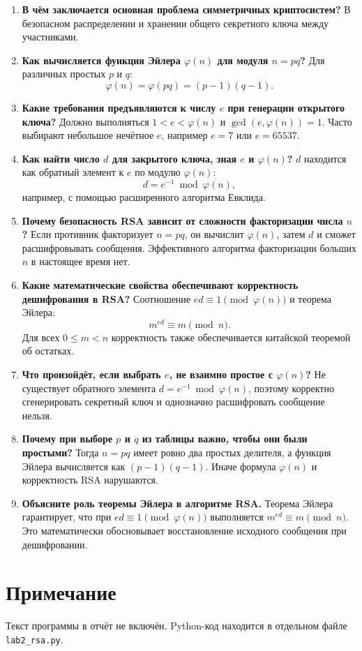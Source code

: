 \documentclass[12pt]{article}
\begin{document}
\begin{enumerate}
    \item \textbf{В чём заключается основная проблема симметричных криптосистем?}  
    В безопасном распределении и хранении общего секретного ключа между участниками.

    \item \textbf{Как вычисляется функция Эйлера \(\varphi(n)\) для модуля \(n=pq\)?}  
    Для различных простых \(p\) и \(q\):
    \[
    \varphi(n)=\varphi(pq)=(p-1)(q-1).
    \]

    \item \textbf{Какие требования предъявляются к числу \(e\) при генерации открытого ключа?}  
    Должно выполняться \(1<e<\varphi(n)\) и \(\gcd(e,\varphi(n))=1\). Часто выбирают небольшое нечётное \(e\), например \(e=7\) или \(e=65537\).

    \item \textbf{Как найти число \(d\) для закрытого ключа, зная \(e\) и \(\varphi(n)\)?}  
    \(d\) находится как обратный элемент к \(e\) по модулю \(\varphi(n)\):
    \[
    d=e^{-1}\bmod\varphi(n),
    \]
    например, с помощью расширенного алгоритма Евклида.

    \item \textbf{Почему безопасность RSA зависит от сложности факторизации числа \(n\)?}  
    Если противник факторизует \(n=pq\), он вычислит \(\varphi(n)\), затем \(d\) и сможет расшифровывать сообщения. Эффективного алгоритма факторизации больших \(n\) в настоящее время нет.

    \item \textbf{Какие математические свойства обеспечивают корректность дешифрования в RSA?}  
    Соотношение \(ed\equiv1\pmod{\varphi(n)}\) и теорема Эйлера:
    \[
    m^{ed}\equiv m\pmod n.
    \]
    Для всех \(0\le m<n\) корректность также обеспечивается китайской теоремой об остатках.

    \item \textbf{Что произойдёт, если выбрать \(e\), не взаимно простое с \(\varphi(n)\)?}  
    Не существует обратного элемента \(d=e^{-1}\bmod\varphi(n)\), поэтому корректно сгенерировать секретный ключ и однозначно расшифровать сообщение нельзя.

    \item \textbf{Почему при выборе \(p\) и \(q\) из таблицы важно, чтобы они были простыми?}  
    Тогда \(n=pq\) имеет ровно два простых делителя, а функция Эйлера вычисляется как \((p-1)(q-1)\). Иначе формула \(\varphi(n)\) и корректность RSA нарушаются.

    \item \textbf{Объясните роль теоремы Эйлера в алгоритме RSA.}  
    Теорема Эйлера гарантирует, что при \(ed\equiv1\pmod{\varphi(n)}\) выполняется \(m^{ed}\equiv m\pmod n\). Это математически обосновывает восстановление исходного сообщения при дешифровании.
\end{enumerate}

\section*{Примечание}
Текст программы в отчёт не включён. Python-код находится в отдельном файле \texttt{lab2\_rsa.py}.
\end{document}
